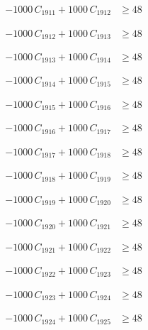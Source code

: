 \documentclass[a4paper,11pt]{article}
\begin{document}
\begin{align}
-1000\,C_{1911} + 1000\,C_{1912} &\geq 48 \nonumber
\end{align}

\begin{align}
-1000\,C_{1912} + 1000\,C_{1913} &\geq 48 \nonumber
\end{align}

\begin{align}
-1000\,C_{1913} + 1000\,C_{1914} &\geq 48 \nonumber
\end{align}

\begin{align}
-1000\,C_{1914} + 1000\,C_{1915} &\geq 48 \nonumber
\end{align}

\begin{align}
-1000\,C_{1915} + 1000\,C_{1916} &\geq 48 \nonumber
\end{align}

\begin{align}
-1000\,C_{1916} + 1000\,C_{1917} &\geq 48 \nonumber
\end{align}

\begin{align}
-1000\,C_{1917} + 1000\,C_{1918} &\geq 48 \nonumber
\end{align}

\begin{align}
-1000\,C_{1918} + 1000\,C_{1919} &\geq 48 \nonumber
\end{align}

\begin{align}
-1000\,C_{1919} + 1000\,C_{1920} &\geq 48 \nonumber
\end{align}

\begin{align}
-1000\,C_{1920} + 1000\,C_{1921} &\geq 48 \nonumber
\end{align}

\begin{align}
-1000\,C_{1921} + 1000\,C_{1922} &\geq 48 \nonumber
\end{align}

\begin{align}
-1000\,C_{1922} + 1000\,C_{1923} &\geq 48 \nonumber
\end{align}

\begin{align}
-1000\,C_{1923} + 1000\,C_{1924} &\geq 48 \nonumber
\end{align}

\begin{align}
-1000\,C_{1924} + 1000\,C_{1925} &\geq 48 \nonumber
\end{align}
\end{document}
